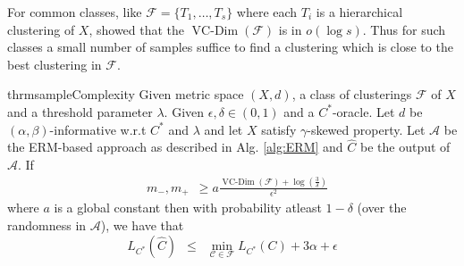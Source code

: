 \documentclass[12pt]{article}
\newcommand{\mc}{\mathcal}
\DeclareMathOperator*{\vcdim}{VC-Dim}
\begin{document}
For common classes, like $\mc F = \{T_1, \ldots, T_s\}$ where each $T_i$ is a hierarchical clustering of $X$, \cite{kushagra2018semisupervised} showed that the $\vcdim(\mc F)$ is in $o(\log s)$. Thus for such classes a small number of samples suffice to find a clustering which is close to the best clustering in $\mc F$.  

\begin{restatable}{thrm}{sampleComplexity}
Given metric space $(X, d)$, a class of clusterings $\mc F$ of $X$ and a threshold parameter $\lambda$. Given $\epsilon, \delta \in (0, 1)$ and a $C^*$-oracle. Let $d$ be $(\alpha, \beta)$-informative w.r.t $C^*$ and $\lambda$ and let $X$ satisfy $\gamma$-skewed property. Let $\mc A$ be the ERM-based approach as described in Alg. \ref{alg:ERM} and $\hat C$ be the output of $\mc A$. If  
\label{thm:sampleComplexity}
\begin{align}
  &m_-, m_+ \enspace \ge a\frac{\vcdim({\mc F}) + \log(\frac{3}{\delta})}{\epsilon^2} 
\end{align}
where $a$ is a global constant then with probability atleast $1-\delta$ (over the randomness in $\mc A$), we have that $$L_{C^*}(\hat C) \enspace\le\enspace \min_{\mc C \in \mc F} L_{C^*}(C) + 3\alpha + \epsilon$$
\end{restatable}
\end{document}
